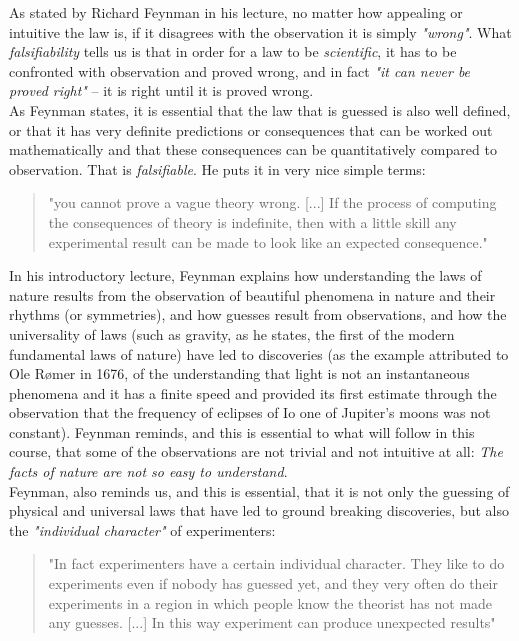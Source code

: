 As stated by Richard Feynman in his lecture, no matter how appealing or intuitive the law is, if it disagrees with the observation it is simply {\it "wrong"}. What {\it falsifiability} tells us is that in order for a law to be {\it scientific}, it has to be confronted with observation and proved wrong, and in fact {\it "it can never be proved right"} -- it is right until it is proved wrong. \\

As Feynman states, it is essential that the law that is guessed is also well defined, or that it has very definite predictions or consequences that can be worked out mathematically and that these consequences can be quantitatively compared to observation. That is {\it falsifiable}. He puts it in very nice simple terms:

\begin{quote}
"you cannot prove a vague theory wrong. [...] If the process of computing the consequences of theory is indefinite, then with a little skill any experimental result can be made to look like an expected consequence."
\end{quote}

In his introductory lecture, Feynman explains how understanding the laws of nature results from the observation of beautiful phenomena in nature and their rhythms (or symmetries), and how guesses result from observations, and how the universality of laws (such as gravity, as he states, the first of the modern fundamental laws of nature) have led to discoveries (as the example attributed to Ole R{\o}mer in 1676, of the understanding that light is not an instantaneous phenomena and it has a finite speed and provided its first estimate through the observation that the frequency of eclipses of Io one of Jupiter's moons was not constant).     
Feynman reminds, and this is essential to what will follow in this course, that some of the observations are not trivial and not intuitive at all: {\it The facts of nature are not so easy to understand}. \\

Feynman, also reminds us, and this is essential, that it is not only the guessing of physical and universal laws that have led to ground breaking discoveries, but also the {\it "individual character"} of experimenters: 

\begin{quote}
    "In fact experimenters have a certain individual character. They like to do experiments even if nobody has guessed yet, and they very often do their experiments in a region in which people know the theorist has not made any guesses. [...] In this way experiment can produce unexpected results"
\end{quote}

